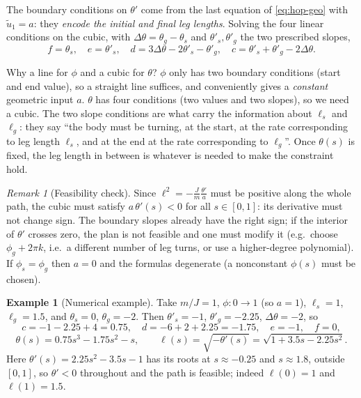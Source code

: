 \documentclass[11pt,a4paper]{article}
\theoremstyle{definition}
\newtheorem{example}[definition]{Example}
\theoremstyle{plain}
\theoremstyle{remark}
\newtheorem{remark}[definition]{Remark}
\begin{document}
The boundary conditions on $\theta'$ come from the last equation of \eqref{eq:hop-geo} with $\tilde u_1=a$: they \emph{encode the initial and final leg lengths}. Solving the four linear conditions on the cubic, with $\Delta\theta=\theta_g-\theta_s$ and $\theta'_s,\theta'_g$ the two prescribed slopes,
\[
  f=\theta_s,\quad e=\theta'_s,\quad d=3\Delta\theta-2\theta'_s-\theta'_g,\quad c=\theta'_s+\theta'_g-2\Delta\theta .
\]

\begin{intuition}
Why a line for $\phi$ and a cubic for $\theta$? $\phi$ only has two boundary conditions (start and end value), so a straight line suffices, and conveniently gives a \emph{constant} geometric input $a$. $\theta$ has four conditions (two values and two slopes), so we need a cubic. The two slope conditions are what carry the information about $\ell_s$ and $\ell_g$: they say ``the body must be turning, at the start, at the rate corresponding to leg length $\ell_s$, and at the end at the rate corresponding to $\ell_g$''. Once $\theta(s)$ is fixed, the leg length in between is whatever is needed to make the constraint hold.
\end{intuition}

\begin{remark}[Feasibility check]
Since $\ell^2=-\frac{J}{m}\frac{\theta'}{a}$ must be positive along the whole path, the cubic must satisfy $a\,\theta'(s)<0$ for all $s\in[0,1]$: its derivative must not change sign. The boundary slopes already have the right sign; if the interior of $\theta'$ crosses zero, the plan is not feasible and one must modify it (e.g.\ choose $\phi_g+2\pi k$, i.e.\ a different number of leg turns, or use a higher-degree polynomial). If $\phi_s=\phi_g$ then $a=0$ and the formulas degenerate (a nonconstant $\phi(s)$ must be chosen).
\end{remark}

\begin{example}[Numerical example]
Take $m/J=1$, $\phi:0\to1$ (so $a=1$), $\ell_s=1$, $\ell_g=1.5$, and $\theta_s=0$, $\theta_g=-2$. Then $\theta'_s=-1$, $\theta'_g=-2.25$, $\Delta\theta=-2$, so
\[
  c=-1-2.25+4=0.75,\quad d=-6+2+2.25=-1.75,\quad e=-1,\quad f=0,
\]
\[
  \theta(s)=0.75s^3-1.75s^2-s,\qquad
  \ell(s)=\sqrt{-\theta'(s)}=\sqrt{1+3.5s-2.25s^2}.
\]
Here $\theta'(s)=2.25s^2-3.5s-1$ has its roots at $s\approx-0.25$ and $s\approx1.8$, outside $[0,1]$, so $\theta'<0$ throughout and the path is feasible; indeed $\ell(0)=1$ and $\ell(1)=1.5$.
\end{example}
\end{document}
